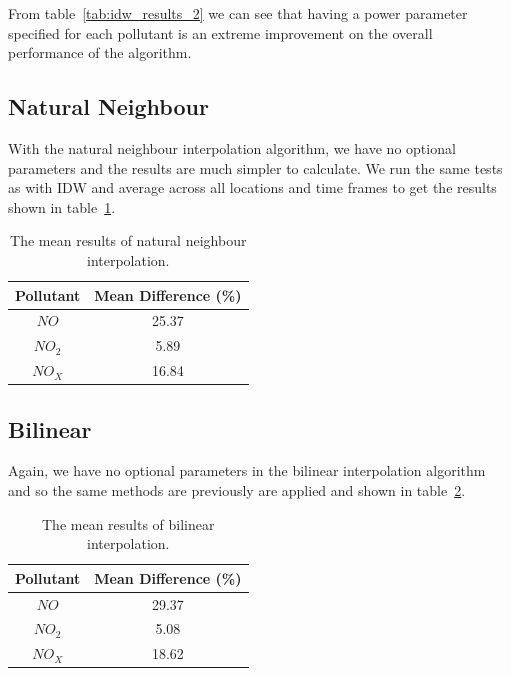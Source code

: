 			From table~\ref{tab:idw_results_2} we can see that having a power parameter specified for each pollutant is an extreme improvement on the overall performance of the algorithm. 

		\subsection{Natural Neighbour}\label{prediction_evaluation_results_natural_neighbour}


        	With the natural neighbour interpolation algorithm, we have no optional parameters and the results are much simpler to calculate. We run the same tests as with IDW and average across all locations and time frames to get the results shown in table~\ref{tab:natural_neighbour_results}.

        	\begin{table}
				\centering
	    		\begin{tabular}{|c|c|}
	    			\hline
					Pollutant & Mean Difference (\%) \\ \hline
					$NO$ & 25.37 \\
					$NO_{2}$ & 5.89 \\
					$NO_{X}$ & 16.84 \\
					\hline
				\end{tabular}
				\caption{The mean results of natural neighbour interpolation.}
				\label{tab:natural_neighbour_results}
			\end{table} 

        \subsection{Bilinear}\label{prediction_evaluation_results_bilinear}


        	Again, we have no optional parameters in the bilinear interpolation algorithm and so the same methods are previously are applied and shown in table~\ref{tab:bilinear_results}.

        	\begin{table}
				\centering
	    		\begin{tabular}{|c|c|}
	    			\hline
					Pollutant & Mean Difference (\%) \\ \hline
					$NO$ & 29.37 \\
					$NO_{2}$ & 5.08 \\
					$NO_{X}$ & 18.62 \\
					\hline
				\end{tabular}
				\caption{The mean results of bilinear interpolation.}
				\label{tab:bilinear_results}
			\end{table} 

